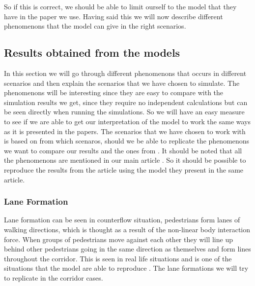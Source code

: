 So if this is correct, we should be able to limit ourself to the model that they have in the paper we use.
Having said this we will now describe different phenomenons that the model can give in the right scenarios.  




\subsection{Results obtained from the models}
In this section we will go through different phenomenons that occurs in different scenarios and then
explain the scenarios that we have chosen to simulate. The phenomenons will be interesting since they
are easy to compare with the simulation results we get, since they require no independent calculations
but can be seen directly when running the simulations. So we will have an easy measure to see if we
are able to get our interpretation of the model to work the same ways as it is presented in the papers.
The scenarios that we have chosen to work with is based on from which scenaros, should we be able
to replicate the phenomenons we want to compare our results and the ones from \cite{self-org}.
It should be noted that all the phenomenons are mentioned in our main article \cite{self-org}.
So it should be possible to reproduce the results from the article using the model they present in the same article. 

\subsubsection{Lane Formation}
Lane formation can be seen in counterflow situation, pedestrians form lanes of walking 
directions, which is thought as a result of the non-linear body interaction 
force. When groups of pedestrians move against each other they will line up behind other
pedestrians going in the same direction as themselves and form lines throughout the corridor.
This is seen in real life situations and is one of the situations that the model are able to reproduce \cite{self-org}.
The lane formations we will try to replicate in the corridor cases.

